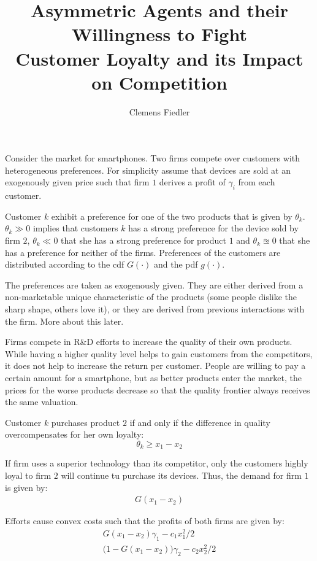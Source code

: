 \documentclass[a4paper, 11pt]{article}
\author{Clemens Fiedler}
\title{Asymmetric Agents and their Willingness to Fight\\
	Customer Loyalty and its Impact on Competition}
\begin{document}
	
\maketitle

Consider the market for smartphones. Two firms compete over customers with heterogeneous preferences. For simplicity assume that devices are sold at an exogenously given price such that firm $1$ derives a profit of $\gamma_i$ from each customer.

Customer $k$ exhibit a preference for one of the two products that is given by $\theta_k$. $\theta_k\gg0$ implies that customers $k$ has a strong preference for the device sold by firm $2$, $\theta_k\ll0$ that she has a strong preference for product $1$ and $\theta_k\approxeq 0$ that she has a preference for neither of the firms. Preferences of the customers are distributed according to the cdf $G(\cdot)$ and the pdf $g(\cdot)$.

The preferences are taken as exogenously given. They are either derived from a non-marketable unique characteristic of the products (some people dislike the sharp shape, others love it), or they are derived from previous interactions with the firm. More about this later.

Firms compete in R\&D efforts to increase the quality of their own products. While having a higher quality level helps to gain customers from the competitors, it does not help to increase the return per customer. People are willing to pay a certain amount for a smartphone, but as better products enter the market, the prices for the worse products decrease so that the quality frontier always receives the same valuation.

Customer $k$ purchases product $2$ if and only if the difference in quality overcompensates for her own loyalty:
$$\theta_k\geq x_1-x_2$$

If firm uses a superior technology than its competitor, only the customers highly loyal to firm $2$ will continue tu purchase its devices. Thus, the demand for firm $1$ is given by:
\begin{align*}
G(x_1-x_2)
\end{align*}

Efforts cause convex costs such that the profits of both firms are given by:
\begin{align}
G(x_1-x_2)\gamma_1 - c_1x_1^2/2\\
\big(1-G(x_1-x_2)\big)\gamma_2 - c_2x_2^2/2
\end{align}
\end{document}
